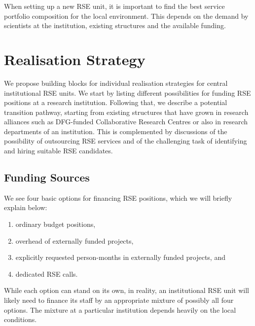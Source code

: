 \documentclass[a4paper]{article}
\begin{document}
When setting up a new RSE unit, it is important to find the best service portfolio composition for the local environment.
This depends on the demand by scientists at the institution, existing structures and the available funding.

\section{Realisation Strategy}%
\label{sec:realisation}

We propose building blocks for individual realisation strategies for central institutional RSE units.
We start by listing different possibilities for funding RSE positions at a research institution.
Following that, we describe a potential transition pathway, starting from existing structures that have grown in research alliances such as DFG-funded Collaborative Research Centres or also in research departments of an institution.
This is complemented by discussions of the possibility of outsourcing RSE services and of the challenging task of identifying and hiring suitable RSE candidates.

\subsection{Funding Sources}%
\label{sec:funding}

We see four basic options for financing RSE positions, which we will briefly explain below:
\begin{enumerate}
\item ordinary budget positions,
\item overhead of externally funded projects,
\item explicitly requested person-months in externally funded projects, and
\item dedicated RSE calls.
\end{enumerate}
While each option can stand on its own, in reality, an institutional RSE unit will likely need to finance its staff by an appropriate mixture of possibly all four options.
The mixture at a particular institution depends heavily on the local conditions.
\end{document}
